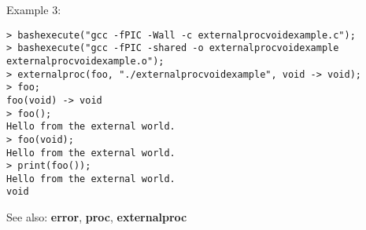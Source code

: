 \noindent Example 3: 
\begin{center}\begin{minipage}{14.8cm}\begin{Verbatim}[frame=single]
> bashexecute("gcc -fPIC -Wall -c externalprocvoidexample.c");
> bashexecute("gcc -fPIC -shared -o externalprocvoidexample externalprocvoidexample.o");
> externalproc(foo, "./externalprocvoidexample", void -> void);
> foo;
foo(void) -> void
> foo();
Hello from the external world.
> foo(void);
Hello from the external world.
> print(foo());
Hello from the external world.
void
\end{Verbatim}
\end{minipage}\end{center}
See also: \textbf{error}, \textbf{proc}, \textbf{externalproc}
